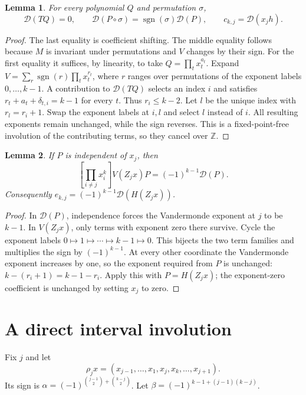 \documentclass[11pt]{article}
\newtheorem{lemma}{Lemma}
\newcommand{\coeff}[2]{\left[#1\right]#2}
\newcommand{\D}{\mathcal D}
\begin{document}
\begin{lemma}\label{lem:trace}
For every polynomial $Q$ and permutation $\sigma$,
\[
 \D(TQ)=0,\qquad
 \D(P\circ\sigma)=\operatorname{sgn}(\sigma)\D(P),\qquad
 c_{k,j}=\D(x_jh).
\]
\end{lemma}
\begin{proof}
The last equality is coefficient shifting. The middle equality follows
because $M$ is invariant under permutations and $V$ changes by their sign.
For the first equality it suffices, by linearity, to take
$Q=\prod_t x_t^{a_t}$. Expand
$V=\sum_r\operatorname{sgn}(r)\prod_t x_t^{r_t}$, where $r$ ranges over
permutations of the exponent labels $0,\ldots,k-1$.
A contribution to $\D(TQ)$ selects an index $i$ and satisfies
$r_t+a_t+\delta_{t,i}=k-1$ for every $t$.
Thus $r_i\le k-2$. Let $l$ be the unique index with $r_l=r_i+1$.
Swap the exponent labels at $i,l$ and select $l$ instead of $i$.
All resulting exponents remain unchanged, while the sign reverses.
This is a fixed-point-free involution of the contributing terms, so they
cancel over $\mathbb Z$.
\end{proof}

\begin{lemma}\label{lem:zero}
If $P$ is independent of $x_j$, then
\[
 \coeff{\prod_{i\ne j}x_i^k}{V(Z_jx)P}
     =(-1)^{k-1}\D(P).
\]
Consequently $e_{k,j}=(-1)^{k-1}\D(H(Z_jx))$.
\end{lemma}
\begin{proof}
In $\D(P)$, independence forces the Vandermonde exponent at $j$ to be
$k-1$. In $V(Z_jx)$, only terms with exponent zero there survive.
Cycle the exponent labels $0\mapsto1\mapsto\cdots\mapsto k-1\mapsto0$.
This bijects the two term families and multiplies the sign by $(-1)^{k-1}$.
At every other coordinate the Vandermonde exponent increases by one,
so the exponent required from $P$ is unchanged:
$k-(r_i+1)=k-1-r_i$. Apply this with $P=H(Z_jx)$; the exponent-zero
coefficient is unchanged by setting $x_j$ to zero.
\end{proof}

\section{A direct interval involution}
Fix $j$ and let
\[
 \rho_jx=(x_{j-1},\ldots,x_1,x_j,x_k,\ldots,x_{j+1}).
\]
Its sign is
$\alpha=(-1)^{\binom{j-1}{2}+\binom{k-j}{2}}$.
Let $\beta=(-1)^{k-1+(j-1)(k-j)}$.
\end{document}
